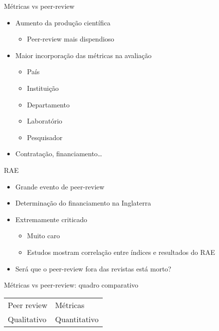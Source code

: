 \documentclass[bigger]{beamer}
\begin{document}
\begin{frame}[label={sec:org0b848fb}]{Métricas vs peer-review}
\begin{itemize}
\item Aumento da produção científica
\begin{itemize}
\item Peer-review mais dispendioso
\end{itemize}

\item Maior incorporação das métricas na avaliação
\begin{itemize}
\item País
\item Instituição
\item Departamento
\item Laboratório
\item Pesquisador
\end{itemize}

\item Contratação, financiamento\ldots{}
\end{itemize}
\end{frame}

\begin{frame}[label={sec:org501f090}]{RAE}
\begin{itemize}
\item Grande evento de peer-review
\item Determinação do financiamento na Inglaterra

\item Extremamente criticado
\begin{itemize}
\item Muito caro
\item Estudos mostram correlação entre índices e resultados do RAE
\end{itemize}

\item Será que o peer-review fora das revistas está morto?
\end{itemize}
\end{frame}

\begin{frame}[label={sec:orgc5a55f5}]{Métricas vs peer-review: quadro comparativo}
\begin{center}
\begin{tabular}{ll}
Peer review & Métricas\\
Qualitativo & Quantitativo\\
\end{tabular}
\end{center}
\end{frame}
\end{document}
